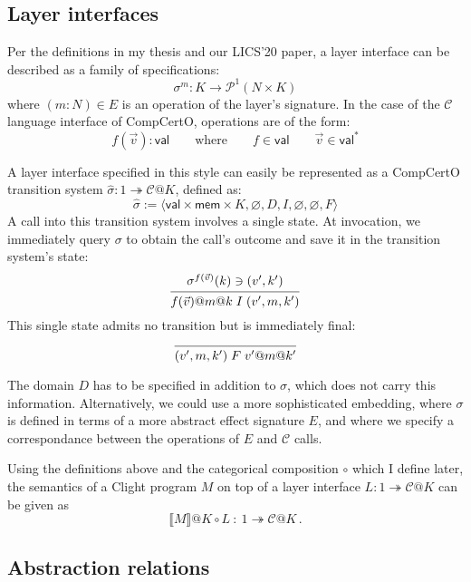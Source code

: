 \documentclass{article}
\begin{document}

\subsection{Layer interfaces} %

Per the definitions in my thesis and our LICS'20 paper,
a layer interface can be described as a family of specifications:
\[
    \sigma^m : K \rightarrow \mathcal{P}^1(N \times K)
\]
where $(m \mathbin: N) \in E$ is an operation of the layer's signature.
In the case of the $\mathcal{C}$ language interface of CompCertO,
operations are of the form:
\[
    f(\vec{v}) : \mathsf{val}
    \qquad
    \text{where}
    \qquad
    f \in \mathsf{val}
    \qquad
    \vec{v} \in \mathsf{val}^*
\]

A layer interface specified in this style
can easily be represented as a CompCertO transition system
$\hat{\sigma} : 1 \twoheadrightarrow \mathcal{C}@K$,
defined as:
\[
  \hat{\sigma} := \langle
    \mathsf{val} \times \mathsf{mem} \times K,
    \varnothing,
    D,
    I,
    \varnothing,
    \varnothing,
    F
  \rangle
\]
A call into this transition system involves a single state.
At invocation,
we immediately query $\sigma$ to obtain the call's outcome
and save it in the transition system's state:
\[
  \begin{prooftree}
    \hypo{\sigma^{f(\vec{v})}(k) \ni (v', k')}
    \infer1{f(\vec{v})@m@k \mathrel{I} (v', m, k')}
  \end{prooftree}
\]
This single state admits no transition but is immediately final:
\[
  \begin{prooftree}
    \infer0{(v', m, k') \mathrel{F} v'@m@k'}
  \end{prooftree}
\]

The domain $D$ has to be specified in addition to $\sigma$,
which does not carry this information.
Alternatively,
we could use a more sophisticated embedding,
where $\sigma$ is defined in terms of a more abstract
effect signature $E$,
and where we specify a correspondance between
the operations of $E$ and $\mathcal{C}$ calls.

Using the definitions above
and the categorical composition $\circ$ which I define later,
the semantics of a Clight program $M$
on top of a layer interface
$L : 1 \twoheadrightarrow \mathcal{C}@K$
can be given as
\[
  \llbracket M \rrbracket @K \circ L \: : \:
  1 \twoheadrightarrow \mathcal{C}@K
  \,.
\]


\subsection{Abstraction relations} %
\end{document}
